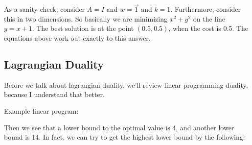 \documentclass[12pt]{article}
\begin{document}

As a sanity check, consider $A = I$ and $w = \vec 1$ and $k = 1$. Furthermore, consider this in two dimensions. So basically we are minimizing $x^2 + y^2$ on the line $y = x+1$. The best solution is at the point $(0.5, 0.5)$, when the cost is 0.5. The equations above work out exactly to this answer.

\subsection{Lagrangian Duality}

Before we talk about lagrangian duality, we'll review linear programming duality, because I understand that better.

Example linear program:


Then we see that a lower bound to the optimal value is 4, and another lower bound is 14. In fact, we can try to get the highest lower bound by the following:

\end{document}
